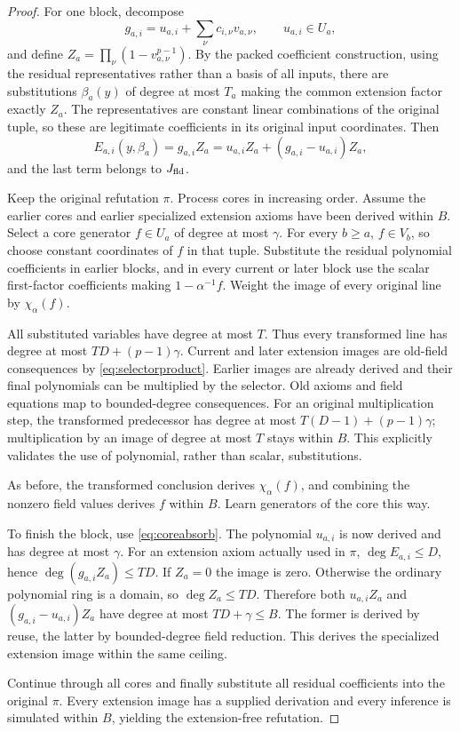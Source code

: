 \begin{proof}
For one block, decompose
\[
 g_{a,i}=u_{a,i}+\sum_\nu c_{i,\nu}v_{a,\nu},\qquad u_{a,i}\in U_a,
\]
and define $Z_a=\prod_\nu(1-v_{a,\nu}^{p-1})$.
By the packed coefficient construction, using the residual representatives rather than a basis of all inputs, there are substitutions $\beta_a(y)$ of degree at most $T_a$ making the common extension factor exactly $Z_a$. The representatives are constant linear combinations of the original tuple, so these are legitimate coefficients in its original input coordinates. Then
\begin{equation}\label{eq:coreabsorb}
 E_{a,i}(y,\beta_a)=g_{a,i}Z_a
 =u_{a,i}Z_a+(g_{a,i}-u_{a,i})Z_a,
\end{equation}
and the last term belongs to $J_{\mathrm{fld}}$.

Keep the original refutation $\pi$. Process cores in increasing order. Assume the earlier cores and earlier specialized extension axioms have been derived within $B$. Select a core generator $f\in U_a$ of degree at most $\gamma$. For every $b\ge a$, $f\in V_b$, so choose constant coordinates of $f$ in that tuple. Substitute the residual polynomial coefficients in earlier blocks, and in every current or later block use the scalar first-factor coefficients making $1-\alpha^{-1}f$. Weight the image of every original line by $\chi_\alpha(f)$.

All substituted variables have degree at most $T$. Thus every transformed line has degree at most $TD+(p-1)\gamma$. Current and later extension images are old-field consequences by \eqref{eq:selectorproduct}. Earlier images are already derived and their final polynomials can be multiplied by the selector. Old axioms and field equations map to bounded-degree consequences. For an original multiplication step, the transformed predecessor has degree at most $T(D-1)+(p-1)\gamma$; multiplication by an image of degree at most $T$ stays within $B$. This explicitly validates the use of polynomial, rather than scalar, substitutions.

As before, the transformed conclusion derives $\chi_\alpha(f)$, and combining the nonzero field values derives $f$ within $B$. Learn generators of the core this way.

To finish the block, use \eqref{eq:coreabsorb}. The polynomial $u_{a,i}$ is now derived and has degree at most $\gamma$. For an extension axiom actually used in $\pi$, $\deg E_{a,i}\le D$, hence $\deg(g_{a,i}Z_a)\le TD$. If $Z_a=0$ the image is zero. Otherwise the ordinary polynomial ring is a domain, so $\deg Z_a\le TD$. Therefore both $u_{a,i}Z_a$ and $(g_{a,i}-u_{a,i})Z_a$ have degree at most $TD+\gamma\le B$. The former is derived by reuse, the latter by bounded-degree field reduction. This derives the specialized extension image within the same ceiling.

Continue through all cores and finally substitute all residual coefficients into the original $\pi$. Every extension image has a supplied derivation and every inference is simulated within $B$, yielding the extension-free refutation.
\end{proof}


